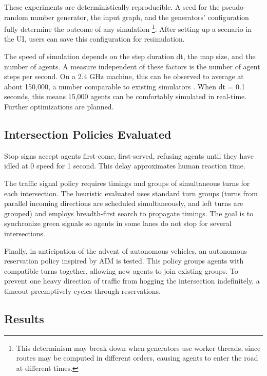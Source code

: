 \documentclass[letterpaper, 10 pt, conference]{ieeeconf}  %
\begin{document}
These experiments are deterministically reproducible. A seed for the
pseudo-random number generator, the input graph, and the generators'
configuration fully determine the outcome of any simulation \footnote{This
  determinism may break down when generators use worker threads, since routes
  may be computed in different orders, causing agents to enter the road at
different times.}. After setting up a scenario in the UI, users can save this
configuration for resimulation.

The speed of simulation depends on the step duration dt, the map size, and the
number of agents. A measure independent of these factors is the number of agent
steps per second. On a 2.4 GHz machine, this can be observed to average at about
150,000, a number comparable to existing simulators \cite{SUMOthesis}. When dt
= 0.1 seconds, this means 15,000 agents can be comfortably simulated in
real-time. Further optimizations are planned.

\subsection{Intersection Policies Evaluated}

Stop signs accept agents first-come, first-served, refusing agents until they
have idled at 0 speed for 1 second. This delay approximates human reaction time.

The traffic signal policy requires timings and groups of simultaneous turns for
each intersection. The heuristic evaluated uses standard turn groups (turns from
parallel incoming directions are scheduled simultaneously, and left turns are
grouped) and employs breadth-first search to propagate timings. The goal is to
synchronize green signals so agents in some lanes do not stop for several
intersections.

Finally, in anticipation of the advent of autonomous vehicles, an autonomous
reservation policy inspired by AIM \cite{JAIR08-dresner} is tested. This policy
groups agents with compatible turns together, allowing new agents to join
existing groups. To prevent one heavy direction of traffic from hogging the
intersection indefinitely, a timeout preemptively cycles through reservations.

\subsection{Results}
\end{document}
